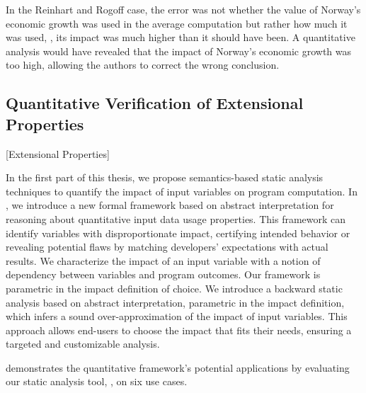 In the Reinhart and Rogoff case,
the error was not whether
the value of Norway's economic growth
was used
in the average computation
but rather how much it was used, \ie,
its impact was much higher than it should have been.
A quantitative analysis would have revealed that the impact of Norway's economic growth was too high, allowing the authors to correct the wrong conclusion.

\subsection{Quantitative Verification of Extensional Properties}[Extensional Properties]


In the first part of this thesis, we propose semantics-based static analysis techniques to quantify the impact of input variables on program computation.
In , we introduce a new formal framework based on abstract interpretation for reasoning about quantitative input data usage properties.
This framework can identify variables with disproportionate impact, certifying intended behavior or revealing potential flaws by matching developers' expectations with actual results.
We characterize the impact of an input variable with a notion of dependency between variables and program outcomes.
Our framework is parametric in the impact definition of choice.
%
We introduce a backward static analysis based on abstract interpretation, parametric in the impact definition, which infers a sound over-approximation of the impact of input variables.
This approach allows end-users to choose the impact that fits their needs, ensuring a targeted and customizable analysis.


 demonstrates the quantitative framework's potential applications by evaluating our static analysis tool, \impatto,\sidenote{\label{intro:impatto}\impattourl} on six use cases.


